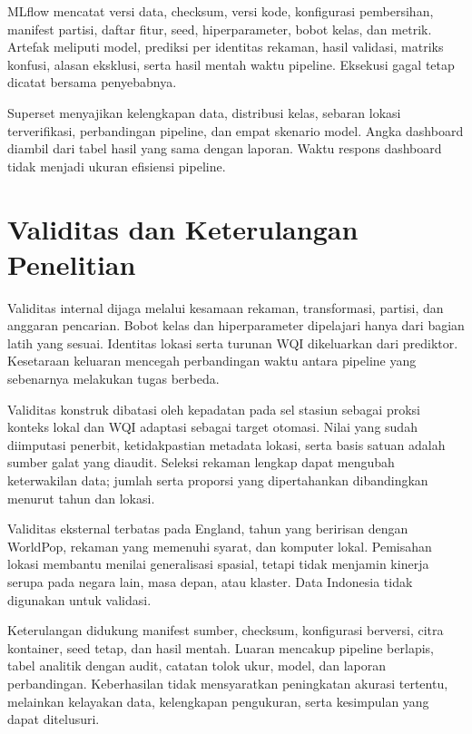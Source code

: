MLflow mencatat versi data, checksum, versi kode, konfigurasi pembersihan, manifest partisi, daftar fitur, seed, hiperparameter, bobot kelas, dan metrik. Artefak meliputi model, prediksi per identitas rekaman, hasil validasi, matriks konfusi, alasan eksklusi, serta hasil mentah waktu pipeline. Eksekusi gagal tetap dicatat bersama penyebabnya.

Superset menyajikan kelengkapan data, distribusi kelas, sebaran lokasi terverifikasi, perbandingan pipeline, dan empat skenario model. Angka dashboard diambil dari tabel hasil yang sama dengan laporan. Waktu respons dashboard tidak menjadi ukuran efisiensi pipeline.

\section{Validitas dan Keterulangan Penelitian}

Validitas internal dijaga melalui kesamaan rekaman, transformasi, partisi, dan anggaran pencarian. Bobot kelas dan hiperparameter dipelajari hanya dari bagian latih yang sesuai. Identitas lokasi serta turunan WQI dikeluarkan dari prediktor. Kesetaraan keluaran mencegah perbandingan waktu antara pipeline yang sebenarnya melakukan tugas berbeda.

Validitas konstruk dibatasi oleh kepadatan pada sel stasiun sebagai proksi konteks lokal dan WQI adaptasi sebagai target otomasi. Nilai yang sudah diimputasi penerbit, ketidakpastian metadata lokasi, serta basis satuan adalah sumber galat yang diaudit. Seleksi rekaman lengkap dapat mengubah keterwakilan data; jumlah serta proporsi yang dipertahankan dibandingkan menurut tahun dan lokasi.

Validitas eksternal terbatas pada England, tahun yang beririsan dengan WorldPop, rekaman yang memenuhi syarat, dan komputer lokal. Pemisahan lokasi membantu menilai generalisasi spasial, tetapi tidak menjamin kinerja serupa pada negara lain, masa depan, atau klaster. Data Indonesia tidak digunakan untuk validasi.

Keterulangan didukung manifest sumber, checksum, konfigurasi berversi, citra kontainer, seed tetap, dan hasil mentah. Luaran mencakup pipeline berlapis, tabel analitik dengan audit, catatan tolok ukur, model, dan laporan perbandingan. Keberhasilan tidak mensyaratkan peningkatan akurasi tertentu, melainkan kelayakan data, kelengkapan pengukuran, serta kesimpulan yang dapat ditelusuri.

